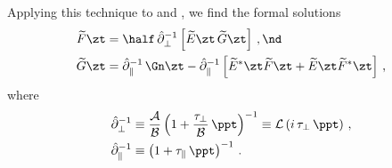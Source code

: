 Applying this technique to  and , we find the formal solutions
\begin{subequations}\label{eqn:mfl_formal_fg}
\begin{align}
\label{eqn:mfl_formal_f} \widetilde{F}\zt &= \half\, \hat{\partial}_\perp^{-1} \left[\widetilde{E}\zt\, \widetilde{G}\zt\right]\, , \nd \\
\label{eqn:mfl_formal_g} \widetilde{G}\zt &= \hat{\partial}_\parallel^{-1}\, \Gn\zt - \hat{\partial}_\parallel^{-1} \left[ \widetilde{E}^\ast\zt \widetilde{F}\zt + \widetilde{E}\zt \widetilde{F}^\ast\zt \right]\, ,
\end{align}
\end{subequations}
where
\begin{subequations}
    \begin{align}
        \hat{\partial}_\perp^{-1} &\equiv \frac{\mathcal{A}}{\mathcal{B}} \left(1 + \frac{\tau_\perp}{\mathcal{B}}\, \ppt\right)^{-1} \equiv \mathcal{L}\left(i\, \tau_\perp\, \ppt\right)\, , \\
        \hat{\partial}_\parallel^{-1} &\equiv \left(1 + \tau_\parallel\, \ppt\right)^{-1}\, .
    \end{align}
\end{subequations}
